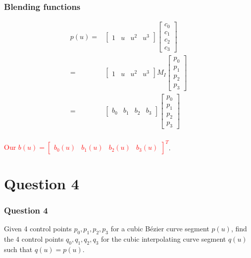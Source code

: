 \documentclass{beamer}
\begin{document}
\begin{frame}
    \frametitle{Blending functions}

    \begin{eqnarray*}
        p(u) =& 
            \begin{bmatrix}
                1 & u & u^2 & u^3
            \end{bmatrix}
            \begin{bmatrix}
                c_{0} \\ c_{1} \\ c_{2} \\ c_{3}
            \end{bmatrix}\\
            =&
            \begin{bmatrix}
                1 & u & u^2 & u^3
            \end{bmatrix} M_I \begin{bmatrix}
                p_0 \\ p_1 \\ p_2 \\ p_3
            \end{bmatrix}\\
            =&
            \begin{bmatrix}
                b_0 & b_1 & b_2 & b_3
            \end{bmatrix}
            \begin{bmatrix}
                p_0 \\ p_1 \\ p_2 \\ p_3
            \end{bmatrix}\\
    \end{eqnarray*}

    \textcolor{red}{Our $b(u) = \begin{bmatrix}
        b_0(u) & b_1(u) & b_2(u) & b_3(u)
    \end{bmatrix}^T$}.

\end{frame}
\fi

\section{Question 4}

\begin{frame}
    \frametitle{Question 4}
    Given 4 control points $p_0, p_1, p_2, p_3$ for a cubic Bézier curve segment $p(u)$, 
    find the 4 control points $q_0, q_1, q_2, q_3$ for the cubic interpolating curve segment $q(u)$
    such that $q(u) = p(u)$.
\end{frame}
\end{document}

